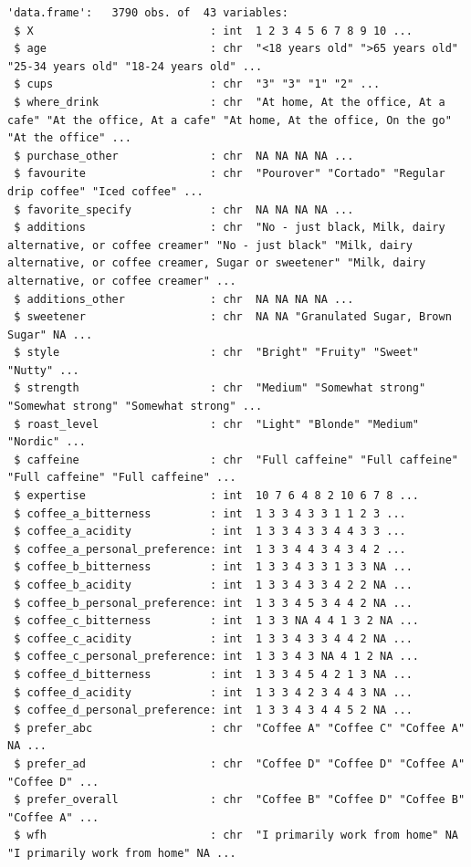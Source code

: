 \documentclass[
  letterpaper,
  DIV=11,
  numbers=noendperiod]{scrartcl}
\begin{document}
\begin{verbatim}
'data.frame':   3790 obs. of  43 variables:
 $ X                           : int  1 2 3 4 5 6 7 8 9 10 ...
 $ age                         : chr  "<18 years old" ">65 years old" "25-34 years old" "18-24 years old" ...
 $ cups                        : chr  "3" "3" "1" "2" ...
 $ where_drink                 : chr  "At home, At the office, At a cafe" "At the office, At a cafe" "At home, At the office, On the go" "At the office" ...
 $ purchase_other              : chr  NA NA NA NA ...
 $ favourite                   : chr  "Pourover" "Cortado" "Regular drip coffee" "Iced coffee" ...
 $ favorite_specify            : chr  NA NA NA NA ...
 $ additions                   : chr  "No - just black, Milk, dairy alternative, or coffee creamer" "No - just black" "Milk, dairy alternative, or coffee creamer, Sugar or sweetener" "Milk, dairy alternative, or coffee creamer" ...
 $ additions_other             : chr  NA NA NA NA ...
 $ sweetener                   : chr  NA NA "Granulated Sugar, Brown Sugar" NA ...
 $ style                       : chr  "Bright" "Fruity" "Sweet" "Nutty" ...
 $ strength                    : chr  "Medium" "Somewhat strong" "Somewhat strong" "Somewhat strong" ...
 $ roast_level                 : chr  "Light" "Blonde" "Medium" "Nordic" ...
 $ caffeine                    : chr  "Full caffeine" "Full caffeine" "Full caffeine" "Full caffeine" ...
 $ expertise                   : int  10 7 6 4 8 2 10 6 7 8 ...
 $ coffee_a_bitterness         : int  1 3 3 4 3 3 1 1 2 3 ...
 $ coffee_a_acidity            : int  1 3 3 4 3 3 4 4 3 3 ...
 $ coffee_a_personal_preference: int  1 3 3 4 4 3 4 3 4 2 ...
 $ coffee_b_bitterness         : int  1 3 3 4 3 3 1 3 3 NA ...
 $ coffee_b_acidity            : int  1 3 3 4 3 3 4 2 2 NA ...
 $ coffee_b_personal_preference: int  1 3 3 4 5 3 4 4 2 NA ...
 $ coffee_c_bitterness         : int  1 3 3 NA 4 4 1 3 2 NA ...
 $ coffee_c_acidity            : int  1 3 3 4 3 3 4 4 2 NA ...
 $ coffee_c_personal_preference: int  1 3 3 4 3 NA 4 1 2 NA ...
 $ coffee_d_bitterness         : int  1 3 3 4 5 4 2 1 3 NA ...
 $ coffee_d_acidity            : int  1 3 3 4 2 3 4 4 3 NA ...
 $ coffee_d_personal_preference: int  1 3 3 4 3 4 4 5 2 NA ...
 $ prefer_abc                  : chr  "Coffee A" "Coffee C" "Coffee A" NA ...
 $ prefer_ad                   : chr  "Coffee D" "Coffee D" "Coffee A" "Coffee D" ...
 $ prefer_overall              : chr  "Coffee B" "Coffee D" "Coffee B" "Coffee A" ...
 $ wfh                         : chr  "I primarily work from home" NA "I primarily work from home" NA ...

\end{verbatim}
\end{document}
